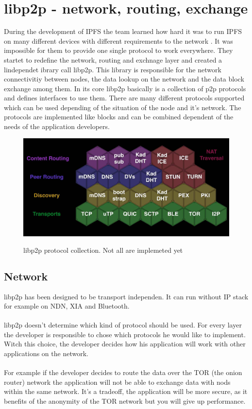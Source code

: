 \documentclass[a4paper,11pt, oneside]{report}
\theoremstyle{definition}
\begin{document}
\newpage
\section{libp2p - network, routing, exchange}
During the development of IPFS the team learned how hard it was to run IPFS on many different devices with different requirements to the network \cite{libp2pissues}. It was impossible for them to provide one single protocol to work everywhere. They startet to redefine the network, routing and exchnage layer and created a lindependet ibrary call libp2p. This library is responsible for the network connectivitiy between nodes, the data lookup on the network and the data block exchange among them. In its core libp2p basically is a collection of p2p protocols and defines interfaces to use them. There are many different protocols supported which can be used depending of the situation of the node and it's network. The protocols are implemented like blocks and can be combined dependent of the needs of the application developers.
\begin{figure}[H]
\centering
\includegraphics[width=\textwidth]{img/libp2p-blocks.png}\\[0.8cm]
\caption[libp2p]{libp2p protocol collection. Not all are implemeted yet}
\end{figure}
\noindent

\newpage
\subsection{Network}
libp2p has been designed to be transport independen. It can run without IP stack for example on NDN, XIA and Bluetooth\cite{libp2pnoip}.\\ \\
libp2p doesn't determine which kind of protocol should be used. For every layer the developer is responsible to chose which protocols he would like to implement. Witch this choice, the developer decides how his application will work with other applications on the network.\\ \\
For example if the developer decides to route the data over the TOR (the onion router) network the application will not be able to exchange data with nods within the same network. It's a tradeoff, the application will be more secure, as it benefits of the anonymity of the TOR network but you will give up performance. 
\end{document}

